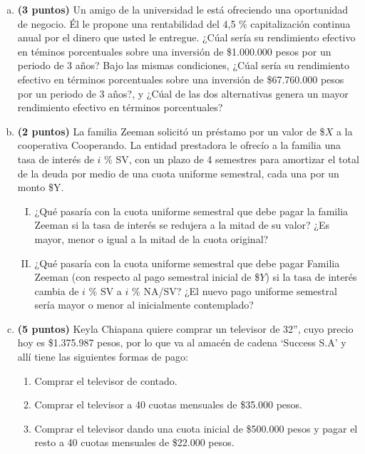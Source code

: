 \documentclass[../main.tex]{subfiles}
\begin{document}
\begin{enumerate}[(a)]
\item \textbf{(3 puntos)} Un amigo de la universidad le está ofreciendo una oportunidad de negocio. Él le propone una rentabilidad del 4,5 \% capitalización continua anual por el dinero que usted le entregue. ¿Cúal sería su rendimiento efectivo en téminos porcentuales sobre una inversión de \$1.000.000 pesos por un periodo de 3 años? Bajo las mismas condiciones, ¿Cúal sería su rendimiento efectivo en términos porcentuales sobre una inversión de \$67.760.000 pesos por un periodo de 3 años?, y ¿Cúal de las dos alternativas genera un mayor rendimiento efectivo en términos porcentuales?

\item \textbf{(2 puntos)} La familia Zeeman solicitó un préstamo por un valor de \$$X$ a la cooperativa Cooperando. La entidad prestadora le ofrecío a la familia una tasa de interés de $i$ \% SV, con un plazo de 4 semestres para amortizar el total de la deuda por medio de una cuota uniforme semestral, cada una por un monto \$Y.

\begin{enumerate}[(I)]

\item ¿Qué pasaría con la cuota uniforme semestral que debe pagar la familia Zeeman si la tasa de interés se redujera a la mitad de su valor? ¿Es mayor, menor o igual a la mitad de la cuota original?

\item ¿Qué pasaría con la cuota uniforme semestral que debe pagar Familia Zeeman (con respecto al pago semestral inicial de \$$Y$) si la tasa de interés cambia de $i$ \% SV a $i$ \% NA/SV? ¿El nuevo pago uniforme semestral sería mayor o menor al inicialmente contemplado?

\end{enumerate}

\item \textbf{(5 puntos)} Keyla Chiapana quiere comprar un televisor de 32”, cuyo precio hoy es \$1.375.987 pesos, por lo que va al amacén de cadena ‘Success S.A’ y allí tiene las siguientes formas de pago:

\begin{enumerate}[(1)]

\item Comprar el televisor de contado.

\item Comprar el televisor a 40 cuotas mensuales de \$35.000 pesos.

\item Comprar el televisor dando una cuota inicial de \$500.000 pesos y pagar el resto a 40 cuotas mensuales de \$22.000 pesos.


\end{enumerate}
\end{enumerate}
\end{document}
